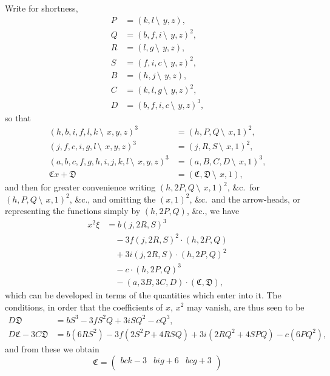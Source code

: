 \documentclass[11pt,a4paper]{book}
\begin{document}
\begin{center}
Write for shortness,
\begin{align*}
P &= (k, l\,\setminus\!\!\:\, y, z),\\
Q &= (b, f, i\,\setminus\!\!\:\, y, z)^2,\\
R &= (l, g\,\setminus\!\!\:\, y, z),\\
S &= (f, i, c\,\setminus\!\!\:\, y, z)^2,\\
B &= (h, j\,\setminus\!\!\:\, y, z),\\
C &= (k, l, g\,\setminus\!\!\:\, y, z)^2,\\
D &= (b, f, i, c\,\setminus\!\!\:\, y, z)^3,
\end{align*}
so that
\begin{align*}
(h, b, i, f, l, k\,\setminus\!\!\:\, x, y, z)^3 &= (h, P, Q\,\setminus\!\!\:\, x, 1)^2,\\
(j, f, c, i, g, l\,\setminus\!\!\:\, x, y, z)^3 &= (j, R, S\,\setminus\!\!\:\, x, 1)^2,\\
(a, b, c, f, g, h, i, j, k, l\,\setminus\!\!\:\, x, y, z)^3 &= (a, B, C, D\,\setminus\!\!\:\, x, 1)^3,\\
\mathfrak{C}x + \mathfrak{D} &= (\mathfrak{C}, \mathfrak{D}\,\setminus\!\!\:\, x, 1),
\end{align*}
and then for greater convenience writing $(h, 2P, Q\,\setminus\!\!\:\, x, 1)^2$, \&c.\ for $(h, P, Q\,\setminus\!\!\:\, x, 1)^2$, \&c., and omitting the $(x, 1)^2$, \&c.\ and the arrow-heads, or representing the functions simply by $(h, 2P, Q)$, \&c., we have
\begin{align*}
x^2\xi &= b(j, 2R, S)^3\\
&\quad - 3f(j, 2R, S)^2 \cdot (h, 2P, Q)\\
&\quad + 3i(j, 2R, S) \cdot (h, 2P, Q)^2\\
&\quad - c \cdot (h, 2P, Q)^3\\
&\quad - (a, 3B, 3C, D) \cdot (\mathfrak{C}, \mathfrak{D}),
\end{align*}
which can be developed in terms of the quantities which enter into it. The conditions, in order that the coefficients of $x$, $x^2$ may vanish, are thus seen to be
\begin{align*}
D\mathfrak{D} &= bS^3 - 3fS^2Q + 3iSQ^2 - cQ^3,\\
D\mathfrak{C} - 3C\mathfrak{D} &= b(6RS^2) - 3f(2S^2P + 4RSQ) + 3i(2RQ^2 + 4SPQ) - c(6PQ^2),
\end{align*}
and from these we obtain
\[
\mathfrak{C} =
\begin{pmatrix}
bck - 3 & big + 6 & bcg + 3 \\

\end{pmatrix}\]
\end{center}
\end{document}
